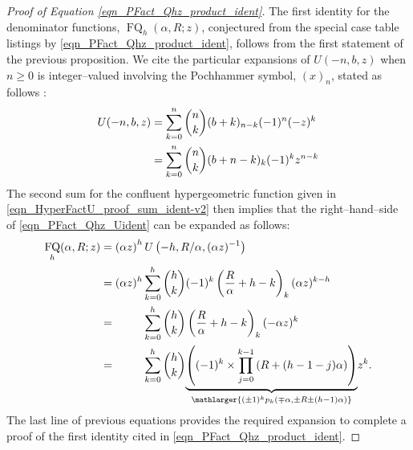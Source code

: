 \documentclass[12pt,reqno]{article}
\numberwithin{sfootnote}{section}
\numberwithin{equation}{section}
\theoremstyle{plain}
\theoremstyle{definition}
\theoremstyle{remark}
\newcommand{\pn}[3]{\ensuremath{p_{#1}\left(#2, #3\right)}}
\newcommand{\HypU}[3]{\ensuremath{U\left(#1, #2, #3\right)}}
\DeclareMathOperator{\FQ}{FQ}
\begin{document}
\begin{proof}[Proof of Equation \eqref{eqn_PFact_Qhz_product_ident}] 
The first identity for the denominator functions, $\FQ_h(\alpha, R; z)$, 
conjectured from the special case table listings by 
\eqref{eqn_PFact_Qhz_product_ident}, follows from the 
first statement of the previous proposition. 
We cite the particular expansions of $U(-n, b, z)$ when 
$n \geq 0$ is integer--valued involving the Pochhammer symbol, $(x)_n$, 
stated as follows \citep[\S 13.2(i)]{NISTHB}: 
\begin{align} 
\notag 
U(-n, b, z) & = \sum_{k=0}^{n} \binom{n}{k} (b+k)_{n-k} (-1)^n (-z)^k \\ 
\label{eqn_HyperFactU_proof_sum_ident-v2} 
   & = 
     \sum_{k=0}^{n} \binom{n}{k} (b+n-k)_{k} (-1)^{k} z^{n-k} 
\end{align} 
The second sum for the confluent hypergeometric function given in 
\eqref{eqn_HyperFactU_proof_sum_ident-v2} 
then implies that the right--hand--side of 
\eqref{eqn_PFact_Qhz_Uident} can be expanded as follows: 
\begin{align*} 
\FQ_h(\alpha, R; z) & = 
     \left(\alpha z\right)^{h} 
     \HypU{-h}{R / \alpha}{(\alpha z)^{-1}} \\ 
   & = 
     (\alpha z)^h \sum_{k=0}^{h} \binom{h}{k} (-1)^k 
     \left(\frac{R}{\alpha} + h-k\right)_{k} (\alpha z)^{k-h} \\ 
   & = \phantom{(\alpha z)^h} 
     \sum_{k=0}^{h} \binom{h}{k} 
     \left(\frac{R}{\alpha} + h-k\right)_{k} (-\alpha z)^{k} \\ 
   & = \phantom{(\alpha z)^h} 
     \sum_{k=0}^{h} \binom{h}{k} 
     \underset{
     \mathlarger{(\pm 1)^{k} \pn{k}{\mp \alpha}{\pm R \pm (h-1) \alpha}}
     }{ 
     \underbrace{ 
     \left( 
     (-1)^{k} \times \prod_{j=0}^{k-1} \left(R+(h-1-j) \alpha \right) 
     \right) 
     } 
     } 
     z^{k}. 
\end{align*} 
The last line of previous equations 
provides the required expansion to complete a proof of the 
first identity cited in \eqref{eqn_PFact_Qhz_product_ident}. 
\end{proof} 
\end{document}
